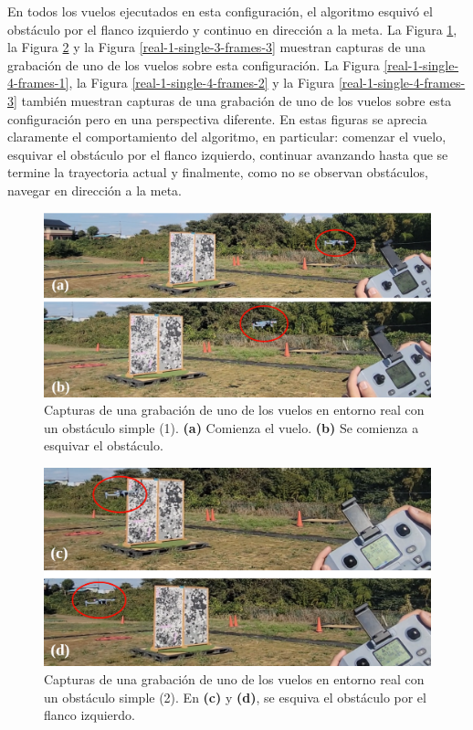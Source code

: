En todos los vuelos ejecutados en esta configuración, el algoritmo esquivó el obstáculo por el flanco izquierdo y continuo en dirección a la meta. La Figura \ref{real-1-single-3-frames-1}, la Figura \ref{real-1-single-3-frames-2} y la Figura \ref{real-1-single-3-frames-3} muestran capturas de una grabación de uno de los vuelos sobre esta configuración. La Figura \ref{real-1-single-4-frames-1}, la Figura \ref{real-1-single-4-frames-2} y la Figura \ref{real-1-single-4-frames-3} también muestran capturas de una grabación de uno de los vuelos sobre esta configuración pero en una perspectiva diferente. En estas figuras se aprecia claramente el comportamiento del algoritmo, en particular: comenzar el vuelo, esquivar el obstáculo por el flanco izquierdo, continuar avanzando hasta que se termine la trayectoria actual y finalmente, como no se observan obstáculos, navegar en dirección a la meta.

\begin{figure}[H]
    \centering
    \includegraphics[scale=0.25]{partes/img/real-1-single-3-frames-1.png}
    \caption[Capturas de una grabación de uno de los vuelos en entorno real con un obstáculo simple (1).]{Capturas de una grabación de uno de los vuelos en entorno real con un obstáculo simple (1). \textbf{(a)} Comienza el vuelo. \textbf{(b)} Se comienza a esquivar el obstáculo.}
    \label{real-1-single-3-frames-1}
\end{figure}

\begin{figure}[H]
    \centering
    \includegraphics[scale=0.255]{partes/img/real-1-single-3-frames-2.png}
    \caption[Capturas de una grabación de uno de los vuelos en entorno real con un obstáculo simple (2).]{Capturas de una grabación de uno de los vuelos en entorno real con un obstáculo simple (2). En \textbf{(c)} y \textbf{(d)}, se esquiva el obstáculo por el flanco izquierdo.}
    \label{real-1-single-3-frames-2}
\end{figure}

